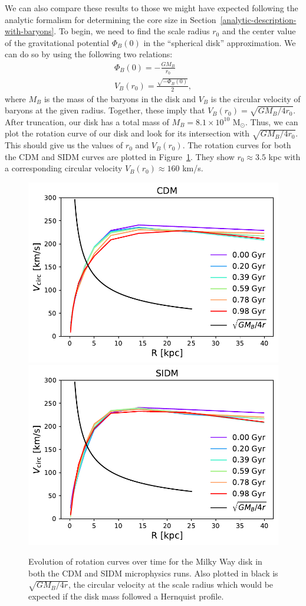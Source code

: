 We can also compare these results to those we might have expected following the
analytic formalism for determining the core size in
Section~\ref{analytic-description-with-baryons}. To begin, we need to find the
scale radius $r_0$ and the center value of the gravitational potential
$\Phi_B(0)$ in the ``spherical disk'' approximation. We can do so by using the
following two relations:
\begin{gather}
    \Phi_B(0) = - \frac{G M_B}{r_0} \\
    V_B(r_0) = \frac{\sqrt{-\Phi_B(0)}}{2},
\end{gather}
where $M_B$ is the mass of the baryons in the disk and $V_B$ is the circular
velocity of baryons at the given radius. Together, these imply that $V_B(r_0) =
\sqrt{G M_B / 4 r_0}$.  After truncation, our disk has a total mass of $M_B =
8.1 \times 10^{10}$ M$_\odot$.  Thus, we can plot the rotation curve of our
disk and look for its intersection with $\sqrt{G M_B / 4 r_0}$.  This should
give us the values of $r_0$ and $V_B(r_0)$.  The rotation curves for both the
CDM and SIDM curves are plotted in Figure~\ref{fig:mw_rot_curves}. They show
$r_0 \approx 3.5$ kpc with a corresponding circular velocity $V_B(r_0) \approx
160$ km/s. 

\begin{figure}
    \centering 
    \includegraphics[width=0.45\linewidth]{figs/mw_cdm_rot_curve.pdf}
    \includegraphics[width=0.45\linewidth]{figs/mw_sidm_rot_curve.pdf}
    \caption{%
        Evolution of rotation curves over time for the Milky Way disk in both
        the CDM and SIDM microphysics runs. Also plotted in black is
        $\sqrt{GM_B/4r}$, the circular velocity at the scale radius which would
        be expected if the disk mass followed a Hernquist profile.
    }
    \label{fig:mw_rot_curves}
\end{figure}

